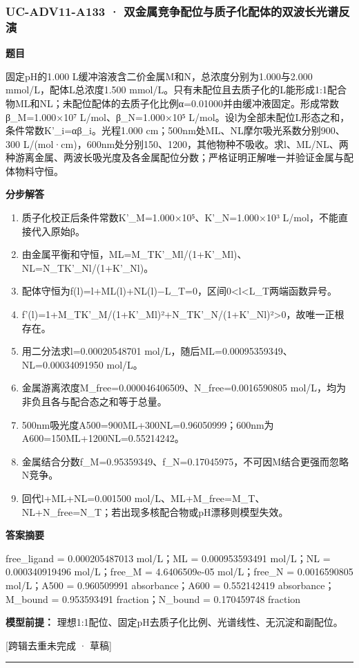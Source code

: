 \documentclass[UTF8,11pt,a4paper]{ctexart}
\begin{document}
\subsubsection*{UC-ADV11-A133 · 双金属竞争配位与质子化配体的双波长光谱反演}
\noindent\textbf{题目}\par
固定pH的1.000 L缓冲溶液含二价金属M和N，总浓度分别为1.000与2.000 mmol/L，配体L总浓度1.500 mmol/L。只有未配位且去质子化的L能形成1:1配合物ML和NL；未配位配体的去质子化比例α=0.01000并由缓冲液固定。形成常数β\_M=1.000×10⁷ L/mol、β\_N=1.000×10⁵ L/mol。设l为全部未配位L形态之和，条件常数K'\_i=αβ\_i。光程1.000 cm；500nm处ML、NL摩尔吸光系数分别900、300 L/(mol·cm)，600nm处分别150、1200，其他物种不吸收。求l、ML/NL、两种游离金属、两波长吸光度及各金属配位分数；严格证明正解唯一并验证金属与配体物料守恒。\par
\medskip\noindent\textbf{分步解答}
\begin{enumerate}
\item 质子化校正后条件常数K'\_M=1.000×10⁵、K'\_N=1.000×10³ L/mol，不能直接代入原始β。
\item 由金属平衡和守恒，ML=M\_TK'\_Ml/(1+K'\_Ml)、NL=N\_TK'\_Nl/(1+K'\_Nl)。
\item 配体守恒为f(l)=l+ML(l)+NL(l)−L\_T=0，区间0<l<L\_T两端函数异号。
\item f'(l)=1+M\_TK'\_M/(1+K'\_Ml)²+N\_TK'\_N/(1+K'\_Nl)²>0，故唯一正根存在。
\item 用二分法求l=0.00020548701 mol/L，随后ML=0.00095359349、NL=0.00034091950 mol/L。
\item 金属游离浓度M\_free=0.000046406509、N\_free=0.0016590805 mol/L，均为非负且各与配合态之和等于总量。
\item 500nm吸光度A500=900ML+300NL=0.96050999；600nm为A600=150ML+1200NL=0.55214242。
\item 金属结合分数f\_M=0.95359349、f\_N=0.17045975，不可因M结合更强而忽略N竞争。
\item 回代l+ML+NL=0.001500 mol/L、ML+M\_free=M\_T、NL+N\_free=N\_T；若出现多核配合物或pH漂移则模型失效。
\end{enumerate}
\noindent\textbf{答案摘要}\par
free\_ligand = 0.000205487013 mol/L；ML = 0.000953593491 mol/L；NL = 0.000340919496 mol/L；free\_M = 4.6406509e-05 mol/L；free\_N = 0.0016590805 mol/L；A500 = 0.960509991 absorbance；A600 = 0.552142419 absorbance；M\_bound = 0.953593491 fraction；N\_bound = 0.170459748 fraction\par
\noindent\textbf{模型前提：}
理想1:1配位、固定pH去质子化比例、光谱线性、无沉淀和副配位。\par
\noindent\textcolor{red!65!black}{[跨辑去重未完成 · 草稿]} \par
\medskip\hrule\medskip
{}
\end{document}
